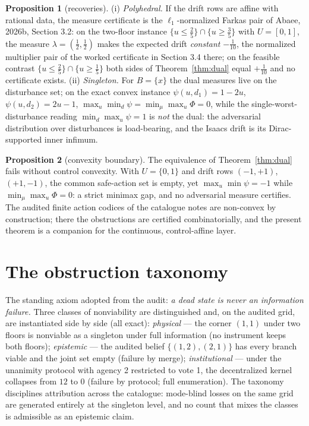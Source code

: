 \documentclass[10pt,twocolumn]{article}
\theoremstyle{definition}
\newtheorem{proposition}{Proposition}
\begin{document}
\begin{proposition}[recoveries]\label{prop:recover}
(i) \emph{Polyhedral.} If the drift rows are affine with rational data,
the measure certificate is the $\ell_{1}$-normalized Farkas pair of
Abaee, 2026b, Section 3.2: on the two-floor instance
$\{u \le \tfrac25\} \cap \{u \ge \tfrac35\}$ with $U = [0,1]$, the
measure $\lambda = (\tfrac12,\tfrac12)$ makes the expected drift
\emph{constant} $-\tfrac1{10}$, the normalized multiplier pair of the
worked certificate in Section 3.4 there; on the feasible contrast
$\{u \le \tfrac25\} \cap \{u \ge \tfrac15\}$ both sides of
Theorem~\ref{thm:dual} equal $+\tfrac1{10}$ and no certificate exists.
(ii) \emph{Singleton.} For $B = \{x\}$ the dual measures live on the
disturbance set; on the exact convex instance
$\psi(u,d_{1}) = 1-2u$, $\psi(u,d_{2}) = 2u-1$,
$\max_{u}\min_{d}\psi = \min_{\mu}\max_{u}\Phi = 0$, while the
single-worst-disturbance reading $\min_{d}\max_{u}\psi = 1$ is
\emph{not} the dual: the adversarial distribution over disturbances is
load-bearing, and the Isaacs drift is its Dirac-supported inner
infimum.
\end{proposition}

\begin{proposition}[convexity boundary]\label{prop:gap}
The equivalence of Theorem~\ref{thm:dual} fails without control
convexity. With $U = \{0,1\}$ and drift rows
$(-1,+1)$, $(+1,-1)$, the common safe-action set is empty, yet
$\max_{u}\min\psi = -1$ while $\min_{\mu}\max_{u}\Phi = 0$: a strict
minimax gap, and no adversarial measure certifies. The audited finite
action codices of the catalogue notes are non-convex by construction;
there the obstructions are certified combinatorially, and the present
theorem is a companion for the continuous, control-affine layer.
\end{proposition}

\section{The obstruction taxonomy}

The standing axiom adopted from the audit: \emph{a dead state is never an
information failure.} Three classes of nonviability are distinguished and,
on the audited grid, are instantiated side by side (all exact):
\emph{physical} --- the corner $(1,1)$ under two floors is nonviable as a
singleton under full information (no instrument keeps both floors);
\emph{epistemic} --- the audited belief $\{(1,2),(2,1)\}$ has every branch
viable and the joint set empty (failure by merge); \emph{institutional}
--- under the unanimity protocol with agency 2 restricted to vote 1, the
decentralized kernel collapses from $12$ to $0$ (failure by protocol;
full enumeration). The taxonomy disciplines attribution across the
catalogue: mode-blind losses on the same grid are generated entirely at the singleton level, and no count
that mixes the classes is admissible as an epistemic claim.
\end{document}
